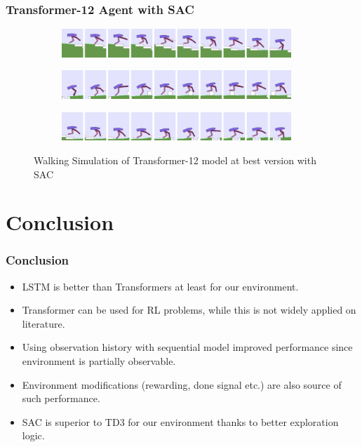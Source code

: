 \documentclass{beamer}
\begin{document}
\begin{frame}
\frametitle{Transformer-12 Agent with SAC}
\begin{figure}[!ht]
	\centering
	\begin{subfigure}{.95\textwidth}
		\centering
		\includegraphics[width=0.95\textwidth]{figures/bipedal/anim/trsf-12-stairs.png}
		\label{fig:anim_trsf_stairs}
	\end{subfigure}
	\begin{subfigure}{.95\textwidth}
		\centering
		\includegraphics[width=0.95\textwidth]{figures/bipedal/anim/trsf-12-hurdle.png}
		\label{fig:anim_trsf_hurdle}
	\end{subfigure}
	\begin{subfigure}{.95\textwidth}
		\centering
		\includegraphics[width=0.95\textwidth]{figures/bipedal/anim/trsf-12-pitfall.png}
		\label{fig:anim_trsf_pitfall}
	\end{subfigure}
	\caption{Walking Simulation of Transformer-12 model at best version with SAC}
	\label{fig:trsf_simulation}
\end{figure}
\end{frame}

\section{Conclusion}
\begin{frame}
\frametitle{Conclusion}
\begin{itemize}
	\item LSTM is better than Transformers at least for our environment.
	\item Transformer can be used for RL problems, while this is not widely applied on literature.
	\item Using observation history with sequential model improved performance since environment is partially observable. 
	\item Environment modifications (rewarding, done signal etc.) are also source of such performance. 
	\item SAC is superior to TD3 for our environment thanks to better exploration logic. 
\end{itemize}
\end{frame}
\end{document}
